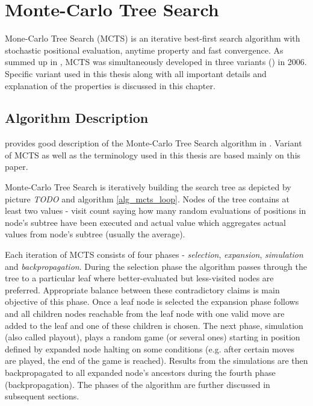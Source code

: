 \chapter{Monte-Carlo Tree Search}
\label{chap_mcts}

Mone-Carlo Tree Search (MCTS) is an iterative best-first search algorithm with stochastic positional
evaluation, anytime property and fast convergence. As \citeauthor{ChaslotPhd2010} summed up in 
\cite{ChaslotPhd2010}, MCTS was simultaneously developed
in three variants (\cites{Chaslot2006}{Coulom2006}{Kocsis2006}) in 2006. Specific variant used in
this thesis along with all important details and explanation of the properties is discussed in this
chapter.


\section{Algorithm Description}

\citeauthor{Chaslot2008} provides good description of the Monte-Carlo Tree Search algorithm in
\cite{Chaslot2008}. Variant of MCTS as well as the terminology used in this thesis are based mainly
on this paper.

Monte-Carlo Tree Search is iteratively building the search tree as depicted by picture
\emph{TODO}%
 and algorithm \ref{alg_mcts_loop}. Nodes of the tree contains at least two values - visit count
 saying how many random evaluations of positions in node's subtree have been executed and actual
 value which aggregates actual values from node's subtree (usually the average).

Each iteration of MCTS consists of four
phases - \emph{selection}, \emph{expansion}, \emph{simulation} and \emph{backpropagation}. During
the selection phase the 
algorithm passes through the tree to a particular leaf where better-evaluated but less-visited nodes
are preferred. Appropriate balance between these contradictory claims is main objective of this
phase. Once a leaf node is selected the expansion phase follows and all children nodes reachable
from the leaf node with one valid move are added to the leaf and one of these children is chosen.
The next phase, simulation (also called playout), plays a random game (or several ones) starting
in position defined by expanded node halting on some conditions (e.g. after certain moves are
played, the end of the game is reached). Results from the simulations are then backpropagated to all
expanded node's ancestors during the fourth phase (backpropagation). The phases of the algorithm are
further discussed in subsequent sections.

